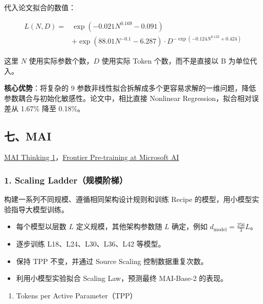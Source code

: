 \documentclass[
  11pt,
  a4paper,
  fontset=none]{ctexart}
\providecommand{\tightlist}{%
  \setlength{\itemsep}{0pt}\setlength{\parskip}{0pt}}
\newenvironment{NotesFormula}{%
  \par\noindent\begin{minipage}{\linewidth}%
  \setlength{\parindent}{2em}%
  \setlength{\parskip}{0.35em}%
}{\end{minipage}\par}
\begin{document}
\begin{NotesFormula}

代入论文拟合的数值：

\[\boxed{
\begin{aligned}
L(N,D)={}&\exp\!\left(-0.021N^{0.169}-0.091\right)\\
&+\exp\!\left(88.01N^{-0.1}-6.287\right)\cdot D^{-\exp\left(-0.124N^{0.123}+0.424\right)}
\end{aligned}}\]

\end{NotesFormula}

这里 \(N\) 使用实际参数个数，\(D\) 使用实际 Token 个数，而不是直接以 B
为单位代入。

\textbf{核心优势}：将复杂的 9
参数非线性拟合拆解成多个更容易求解的一维问题，降低参数耦合与初始化敏感性。论文中，相比直接
Nonlinear Regression，拟合相对误差从 1.67\% 降至 0.18\%。

\clearpage

\subsection{七、MAI}\label{ux4e03mai}

\href{https://microsoft.ai/pdf/mai-thinking-1.pdf}{MAI Thinking
1}，\href{https://microsoft.ai/news/frontier-pre-training-at-microsoft-ai/}{Frontier
Pre-training at Microsoft AI}

\subsubsection{1. Scaling
Ladder（规模阶梯）}\label{scaling-ladderux89c4ux6a21ux9636ux68af}

构建一系列不同规模、遵循相同架构设计规则和训练 Recipe
的模型，用小模型实验指导大模型训练。

\begin{itemize}
\tightlist
\item
  每个模型以层数 \(L\) 定义规模，其他架构参数随 \(L\) 确定，例如
  \(d_{\mathrm{model}}=\frac{256}{3}L\)。
\item
  逐步训练 L18、L24、L30、L36、L42 等模型。
\item
  保持 TPP 不变，并通过 Source Scaling 控制数据重复次数。
\item
  利用小模型实验拟合 Scaling Law，预测最终 MAI-Base-2 的表现。
\end{itemize}

\begin{enumerate}
\def\labelenumi{\arabic{enumi}.}
\setcounter{enumi}{1}
\tightlist
\item
  Tokens per Active Parameter（TPP）
\end{enumerate}
\end{document}
